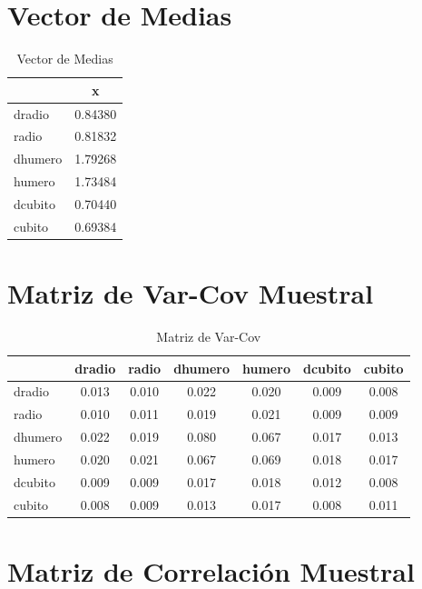 \documentclass[12pt,a4paper,]{book}
\numberwithin{dummy}{section}
\theoremstyle{ocrenumbox}
\theoremstyle{ocrenumbox}
\theoremstyle{ocrenumbox}
\theoremstyle{ocrenumbox}
\theoremstyle{ocrenum}
\begin{document}
\hypertarget{vector-de-medias}{%
\section{Vector de Medias}\label{vector-de-medias}}

\begingroup\fontsize{8}{10}\selectfont

\begin{longtable}[t]{lc}
\caption{\label{tab:unnamed-chunk-3}Vector de Medias}\\
\toprule
 & x\\
\midrule
dradio & 0.84380\\
radio & 0.81832\\
dhumero & 1.79268\\
humero & 1.73484\\
dcubito & 0.70440\\
\addlinespace
cubito & 0.69384\\
\bottomrule
\end{longtable}
\endgroup{}

\hypertarget{matriz-de-var-cov-muestral}{%
\section{Matriz de Var-Cov Muestral}\label{matriz-de-var-cov-muestral}}

\begingroup\fontsize{8}{10}\selectfont

\begin{longtable}[t]{lcccccc}
\caption{\label{tab:unnamed-chunk-4}Matriz de Var-Cov}\\
\toprule
 & dradio & radio & dhumero & humero & dcubito & cubito\\
\midrule
dradio & 0.013 & 0.010 & 0.022 & 0.020 & 0.009 & 0.008\\
radio & 0.010 & 0.011 & 0.019 & 0.021 & 0.009 & 0.009\\
dhumero & 0.022 & 0.019 & 0.080 & 0.067 & 0.017 & 0.013\\
humero & 0.020 & 0.021 & 0.067 & 0.069 & 0.018 & 0.017\\
dcubito & 0.009 & 0.009 & 0.017 & 0.018 & 0.012 & 0.008\\
\addlinespace
cubito & 0.008 & 0.009 & 0.013 & 0.017 & 0.008 & 0.011\\
\bottomrule
\end{longtable}
\endgroup{}

\hypertarget{matriz-de-correlaciuxf3n-muestral}{%
\section{Matriz de Correlación
Muestral}\label{matriz-de-correlaciuxf3n-muestral}}
\end{document}
